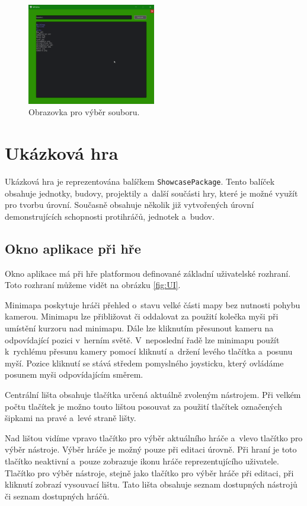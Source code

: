 \begin{figure}[h]
	\centering
	\includegraphics[width=0.5\textwidth]{img/FilePickingScreen.png}
	\caption{Obrazovka pro výběr souboru.}
	\label{fig:filepicking}
\end{figure}

\section{Ukázková hra}
Ukázková hra je reprezentována balíčkem \texttt{ShowcasePackage}. Tento balíček obsahuje jednotky, budovy, projektily a~další součásti hry, které je možné využít pro tvorbu úrovní. Současně obsahuje několik již vytvořených úrovní demonstrujících schopnosti protihráčů, jednotek a~budov.

\subsection{Okno aplikace při hře}
\label{sec:appwindow}
Okno aplikace má při hře platformou definované základní uživatelské rozhraní. Toto rozhraní můžeme vidět na obrázku \ref{fig:UI}. 

Minimapa poskytuje hráči přehled o~stavu velké části mapy bez nutnosti pohybu kamerou. Minimapu lze přibližovat či oddalovat za použití kolečka myši při umístění kurzoru nad minimapu. Dále lze kliknutím přesunout kameru na odpovídající pozici v~herním světě. V~neposlední řadě lze minimapu použít k~rychlému přesunu kamery pomocí kliknutí a~držení levého tlačítka a~posunu myší. Pozice kliknutí se stává středem pomyslného joysticku, který ovládáme posunem myši odpovídajícím směrem.

Centrální lišta obsahuje tlačítka určená aktuálně zvoleným nástrojem. Při velkém počtu tlačítek je možno touto lištou posouvat za použití tlačítek označených šipkami na pravé a~levé straně lišty.

Nad lištou vidíme vpravo tlačítko pro výběr aktuálního hráče a~vlevo tlačítko pro výběr nástroje. Výběr hráče je možný pouze při editaci úrovně. Při hraní je toto tlačítko neaktivní a~pouze zobrazuje ikonu hráče reprezentujícího uživatele. Tlačítko pro výběr nástroje, stejně jako tlačítko pro výběr hráče při editaci, při kliknutí zobrazí vysouvací lištu. Tato lišta obsahuje seznam dostupných nástrojů či seznam dostupných hráčů.

